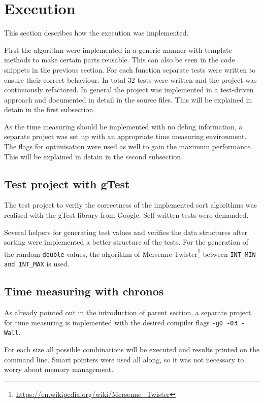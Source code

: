 \documentclass[11pt]{amsart}
\begin{document}
\newpage
\section{Execution}
This section describes how the execution was implemented. 

First the algorithm were implemented in a generic manner with template methods to make certain parts reusable. This can also be seen in the code snippets in the previous section. For each function separate tests were written to ensure their correct behaviour. In total 32 tests were written and the project was continuously refactored. In general the project was implemented in a test-driven approach and documented in detail in the source files. This will be explained in detain in the first subsection.

As the time measuring should be implemented with no debug information, a separate project was set up with an appropriate time measuring environment. The flags for optimisation were used as well to gain the maximum performance. This will be explained in detain in the second subsection.

%
%
\subsection{Test project with gTest}
The test project to verify the correctness of the implemented sort algorithms was realised with the gTest library from Google. Self-written tests were demanded. 

Several helpers for generating test values and verifies the data structures after sorting were implemented a better structure of the tests. For the generation of the random \texttt{double} values, the algorithm of Mersenne-Twister\footnote{\url{https://en.wikipedia.org/wiki/Mersenne_Twister}} between \texttt{INT\_MIN and INT\_MAX} is used.
%
%
\subsection{Time measuring with chronos}
As already pointed out in the introduction of parent section, a separate project for time measuring is implemented with the desired compiler flags \texttt{-g0 -03 -Wall}. 

For each size all possible combinations will be executed and results printed on the command line. Smart pointers were used all along, so it was not necessary to worry about memory management.
\end{document}
